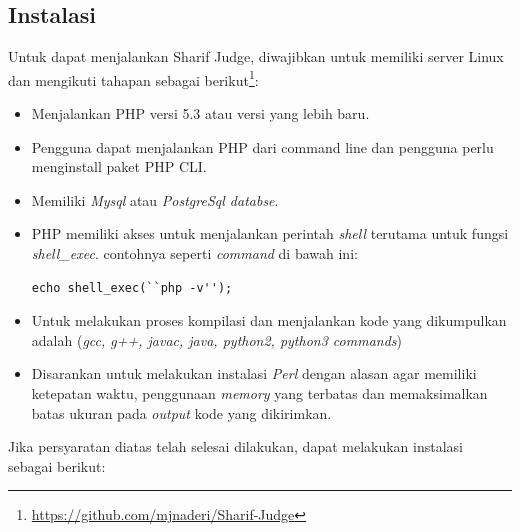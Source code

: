 \subsection{Instalasi}
\label{sec:Instalasi}
Untuk dapat menjalankan Sharif Judge, diwajibkan untuk memiliki server Linux dan mengikuti tahapan sebagai berikut\footnote{\url{https://github.com/mjnaderi/Sharif-Judge}\label{github}}:
\begin{itemize}
    \item Menjalankan PHP versi 5.3 atau versi yang lebih baru.
    \item Pengguna dapat menjalankan PHP dari command line  dan pengguna perlu menginstall paket PHP CLI.
    \item Memiliki \textit{Mysql} atau \textit{PostgreSql databse}.
    \item PHP memiliki akses untuk menjalankan perintah \textit{shell} terutama untuk fungsi \textit{shell\_exec}. contohnya seperti \textit{command} di bawah ini: 
    
     \begin{lstlisting}[basicstyle=\ttfamily, frame=single,
    columns=fullflexible, breaklines=true, numbers=none]
echo shell_exec(``php -v'');
    \end{lstlisting}
    
    \item Untuk melakukan proses kompilasi dan menjalankan kode yang dikumpulkan adalah (\textit{gcc, g++, javac, java, python2, python3 commands})
    \item Disarankan untuk melakukan instalasi \textit{Perl} dengan alasan agar memiliki ketepatan waktu, penggunaan \textit{memory} yang terbatas dan memaksimalkan batas ukuran pada \textit{output} kode yang dikirimkan.
\end{itemize}
Jika persyaratan diatas telah selesai dilakukan, dapat melakukan instalasi sebagai berikut: 

